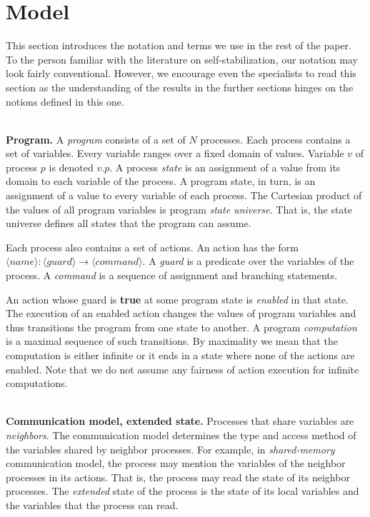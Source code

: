 \documentclass[11pt]{llncs}
\begin{document}
\section{Model}\label{SecModel}

This section introduces the notation and terms we use in the
rest of the paper. To the person familiar with the literature on
self-stabilization, our notation may look fairly
conventional. However, we encourage even the specialists to read
this section as the understanding of the results in the
further sections hinges on the notions defined in this one.

\ \\ \textbf{Program.} A \emph{program} consists of a set of $N$
processes. Each process contains a set of variables.  Every variable
ranges over a fixed domain of values. Variable $v$ of process $p$ is
denoted $v.p$. A process \emph{state} is an assignment of a value from
its domain to each variable of the process. A program state, in turn,
is an assignment of a value to every variable of each process. The
Cartesian product of the values of all program variables is program
\emph{state universe}. That is, the state universe defines all states
that the program can assume.

Each process also contains a set of actions. An action has the form
$\langle name\rangle : \langle guard \rangle \longrightarrow \langle
command \rangle$. A \emph{guard} is a predicate over the variables of
the process. A \emph{command} is a sequence of assignment and
branching statements.


An action whose guard is \textbf{true} at some program state is
\emph{enabled} in that state. The execution of an enabled action
changes the values of program variables and thus transitions the
program from one state to another. A program \emph{computation} is a
maximal sequence of such transitions. By maximality we mean that the
computation is either infinite or it ends in a state where none of the
actions are enabled. Note that we do not assume any fairness of action
execution for infinite computations.

\ \\ \textbf{Communication model, extended state.} Processes that
share variables are \emph{neighbors}.  The communication model
determines the type and access method of the variables shared by
neighbor processes. For example, in \emph{shared-memory} communication
model, the process may mention the variables of the neighbor processes
in its actions. That is, the process may read the state of its
neighbor processes. The \emph{extended} state of the process is the
state of its local variables and the variables that the process can
read.
\end{document}
